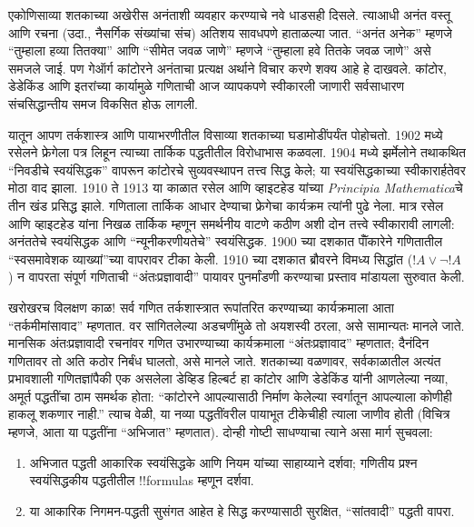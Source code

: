 \documentclass[../../../include/open-logic-section]{subfiles}
\begin{document}
एकोणिसाव्या शतकाच्या अखेरीस अनंताशी व्यवहार करण्याचे नवे धाडसही दिसले.
त्याआधी अनंत वस्तू आणि रचना (उदा., नैसर्गिक संख्यांचा संच) अतिशय
सावधपणे हाताळल्या जात. ``अनंत अनेक'' म्हणजे ``तुम्हाला हव्या तितक्या''
आणि ``सीमेत जवळ जाणे'' म्हणजे ``तुम्हाला हवे तितके जवळ जाणे'' असे समजले
जाई. पण गेऑर्ग कांटोरने अनंताचा प्रत्यक्ष अर्थाने विचार करणे शक्य आहे हे
दाखवले. कांटोर, डेडेकिंड आणि इतरांच्या कार्यामुळे गणिताची आज व्यापकपणे
स्वीकारली जाणारी सर्वसाधारण संचसिद्धान्तीय समज विकसित होऊ लागली.

यातून आपण तर्कशास्त्र आणि पायाभरणीतील विसाव्या शतकाच्या घडामोडींपर्यंत
पोहोचतो. 1902 मध्ये रसेलने फ्रेगेला पत्र लिहून त्याच्या तार्किक पद्धतीतील
विरोधाभास कळवला.
1904 मध्ये झर्मेलोने तथाकथित ``निवडीचे स्वयंसिद्धक'' वापरून कांटोरचे
सुव्यवस्थापन तत्त्व सिद्ध केले; या स्वयंसिद्धकाच्या स्वीकारार्हतेवर मोठा वाद
झाला. 1910 ते 1913 या काळात रसेल आणि व्हाइटहेड यांच्या \emph{Principia
  Mathematica}चे तीन खंड प्रसिद्ध झाले. गणिताला तार्किक आधार देण्याचा
फ्रेगेचा कार्यक्रम त्यांनी पुढे नेला. मात्र रसेल आणि व्हाइटहेड यांना
निखळ तार्किक म्हणून समर्थनीय वाटणे कठीण अशी दोन तत्त्वे स्वीकारावी
लागली: अनंततेचे स्वयंसिद्धक आणि ``न्यूनीकरणीयतेचे'' स्वयंसिद्धक. 1900
च्या दशकात पॉँकारेने गणितातील ``स्वसमावेशक व्याख्यां''च्या वापरावर
टीका केली. 1910 च्या दशकात ब्रौवरने विमध्य सिद्धांत
($!A \lor \lnot !A$) न वापरता संपूर्ण गणिताची ``अंतःप्रज्ञावादी''
पायावर पुनर्मांडणी करण्याचा प्रस्ताव मांडायला सुरुवात केली.

खरोखरच विलक्षण काळ!{} सर्व गणित तर्कशास्त्रात रूपांतरित करण्याच्या
कार्यक्रमाला आता ``तर्कमीमांसावाद'' म्हणतात. वर सांगितलेल्या अडचणींमुळे
तो अयशस्वी ठरला, असे सामान्यतः मानले जाते. मानसिक अंतःप्रज्ञावादी
रचनांवर गणित उभारण्याच्या कार्यक्रमाला ``अंतःप्रज्ञावाद'' म्हणतात;
दैनंदिन गणितावर तो अति कठोर निर्बंध घालतो, असे मानले जाते. शतकाच्या
वळणावर, सर्वकाळातील अत्यंत प्रभावशाली गणितज्ञांपैकी एक असलेला डेव्हिड
हिल्बर्ट हा कांटोर आणि डेडेकिंड यांनी आणलेल्या नव्या, अमूर्त पद्धतींचा
ठाम समर्थक होता: ``कांटोरने आपल्यासाठी निर्माण केलेल्या स्वर्गातून
आपल्याला कोणीही हाकलू शकणार नाही.'' त्याच वेळी, या नव्या पद्धतींवरील
पायाभूत टीकेचीही त्याला जाणीव होती (विचित्र म्हणजे, आता या पद्धतींना
``अभिजात'' म्हणतात). दोन्ही गोष्टी साधण्याचा त्याने असा मार्ग सुचवला:
\begin{enumerate}
\item अभिजात पद्धती आकारिक स्वयंसिद्धके आणि नियम यांच्या साहाय्याने
  दर्शवा; गणितीय प्रश्न स्वयंसिद्धकीय पद्धतीतील !!{formula}s म्हणून दर्शवा.
\item या आकारिक निगमन-पद्धती सुसंगत आहेत हे सिद्ध करण्यासाठी सुरक्षित,
  ``सांतवादी'' पद्धती वापरा.
\end{enumerate}
\end{document}
